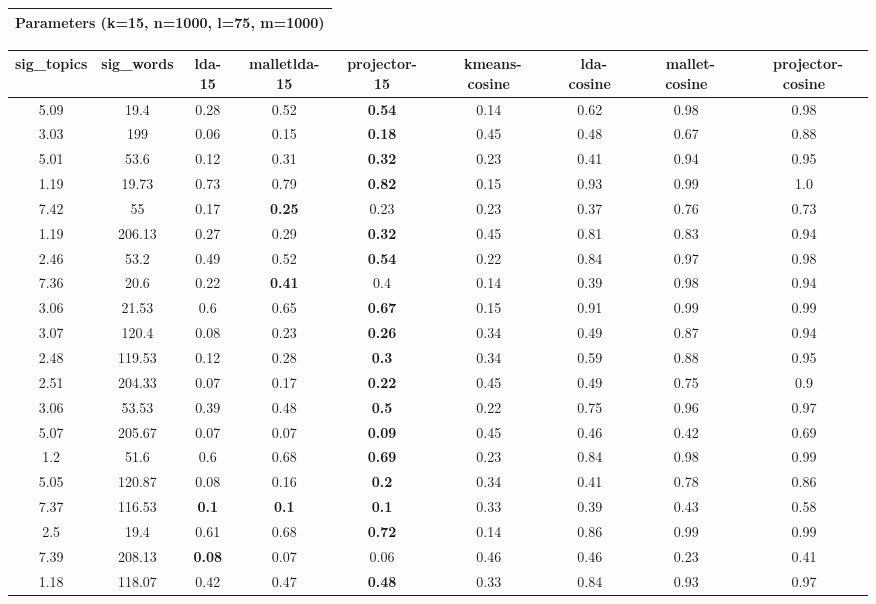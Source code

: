 \documentclass[10pt]{article}
\begin{document}
\begin{tabular}{|c|}
\hline 
 Parameters (k=15, n=1000, l=75, m=1000) \\
 \hline 

\end{tabular}



\begin{tabular}{|c|c|c|c|c|c|c|c|c|}
\hline 
sig\_topics &sig\_words &lda-15 &malletlda-15 &projector-15 &~kmeans-cosine &~lda-cosine &~mallet-cosine &~projector-cosine \\
 \hline 
5.09  &19.4  &0.28  &0.52  &\textbf{0.54}
  &0.14  &0.62  &0.98  &0.98  \\
 \hline 
3.03  &199  &0.06  &0.15  &\textbf{0.18}
  &0.45  &0.48  &0.67  &0.88  \\
 \hline 
5.01  &53.6  &0.12  &0.31  &\textbf{0.32}
  &0.23  &0.41  &0.94  &0.95  \\
 \hline 
1.19  &19.73  &0.73  &0.79  &\textbf{0.82}
  &0.15  &0.93  &0.99  &1.0  \\
 \hline 
7.42  &55  &0.17  &\textbf{0.25}
  &0.23  &0.23  &0.37  &0.76  &0.73  \\
 \hline 
1.19  &206.13  &0.27  &0.29  &\textbf{0.32}
  &0.45  &0.81  &0.83  &0.94  \\
 \hline 
2.46  &53.2  &0.49  &0.52  &\textbf{0.54}
  &0.22  &0.84  &0.97  &0.98  \\
 \hline 
7.36  &20.6  &0.22  &\textbf{0.41}
  &0.4  &0.14  &0.39  &0.98  &0.94  \\
 \hline 
3.06  &21.53  &0.6  &0.65  &\textbf{0.67}
  &0.15  &0.91  &0.99  &0.99  \\
 \hline 
3.07  &120.4  &0.08  &0.23  &\textbf{0.26}
  &0.34  &0.49  &0.87  &0.94  \\
 \hline 
2.48  &119.53  &0.12  &0.28  &\textbf{0.3}
  &0.34  &0.59  &0.88  &0.95  \\
 \hline 
2.51  &204.33  &0.07  &0.17  &\textbf{0.22}
  &0.45  &0.49  &0.75  &0.9  \\
 \hline 
3.06  &53.53  &0.39  &0.48  &\textbf{0.5}
  &0.22  &0.75  &0.96  &0.97  \\
 \hline 
5.07  &205.67  &0.07  &0.07  &\textbf{0.09}
  &0.45  &0.46  &0.42  &0.69  \\
 \hline 
1.2  &51.6  &0.6  &0.68  &\textbf{0.69}
  &0.23  &0.84  &0.98  &0.99  \\
 \hline 
5.05  &120.87  &0.08  &0.16  &\textbf{0.2}
  &0.34  &0.41  &0.78  &0.86  \\
 \hline 
7.37  &116.53  &\textbf{0.1}
  &\textbf{0.1}
  &\textbf{0.1}
  &0.33  &0.39  &0.43  &0.58  \\
 \hline 
2.5  &19.4  &0.61  &0.68  &\textbf{0.72}
  &0.14  &0.86  &0.99  &0.99  \\
 \hline 
7.39  &208.13  &\textbf{0.08}
  &0.07  &0.06  &0.46  &0.46  &0.23  &0.41  \\
 \hline 
1.18  &118.07  &0.42  &0.47  &\textbf{0.48}
  &0.33  &0.84  &0.93  &0.97  \\
 \hline 

\end{tabular}
\end{document}
